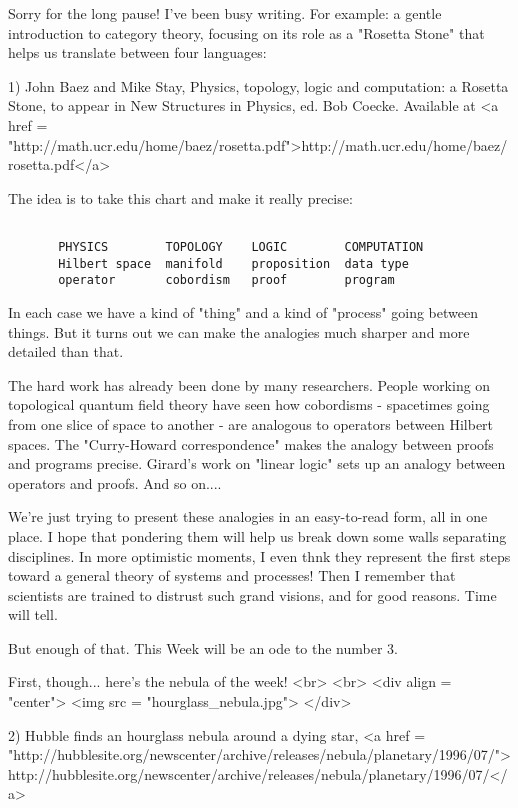 


Sorry for the long pause!  I've been busy writing.  For example: 
a gentle introduction to category theory, focusing on its role 
as a "Rosetta Stone" that helps us translate between four languages:

1) John Baez and Mike Stay, Physics, topology, logic and 
computation: a Rosetta Stone, to appear in New Structures in 
Physics, ed. Bob Coecke.  Available at 
<a href = "http://math.ucr.edu/home/baez/rosetta.pdf">http://math.ucr.edu/home/baez/rosetta.pdf</a>

The idea is to take this chart and make it really precise:


\begin{verbatim}

       PHYSICS        TOPOLOGY    LOGIC        COMPUTATION
       Hilbert space  manifold    proposition  data type
       operator       cobordism   proof        program
\end{verbatim}
    

In each case we have a kind of "thing" and a kind of
"process" going between things.  But it turns out we can
make the analogies much sharper and more detailed than that.

The hard work has already been done by many researchers. 
People working on topological quantum field theory have seen
how cobordisms - spacetimes going from one slice of space to
another - are analogous to operators between Hilbert spaces.
The "Curry-Howard correspondence" makes the analogy between
proofs and programs precise.  Girard's work on "linear logic" 
sets up an analogy between operators and proofs.  And so on....

We're just trying to present these analogies in an easy-to-read 
form, all in one place.  I hope that pondering them will help us
break down some walls separating disciplines.  In more optimistic 
moments, I even thnk they represent the first steps toward a 
general theory of systems and processes!  Then I remember that 
scientists are trained to distrust such grand visions, and for 
good reasons.  Time will tell.

But enough of that.  This Week will be an ode to the number 3. 

First, though... here's the nebula of the week!
<br>
<br>
<div align = "center">
<img src = "hourglass_nebula.jpg">
</div>

2) Hubble finds an hourglass nebula around a dying star,
<a href = "http://hubblesite.org/newscenter/archive/releases/nebula/planetary/1996/07/">http://hubblesite.org/newscenter/archive/releases/nebula/planetary/1996/07/</a>

